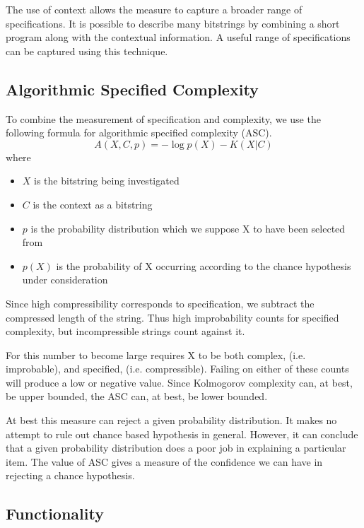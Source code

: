 The use of context allows the measure to capture a broader range of specifications.
It is possible to describe many bitstrings by combining a short program along with the contextual information.
A useful range of specifications can be captured using this technique.

\subsection{Algorithmic Specified Complexity}

To combine the measurement of specification and complexity, we use the following formula for algorithmic specified complexity (ASC).
\begin{equation}
    \label{ASC}
    A(X,C,p) = -\log p(X) - K(X|C)
\end{equation} where
\begin{itemize}
    \item $X$ is the bitstring being investigated
    \item $C$ is the context as a bitstring
    \item $p$ is the probability distribution which we suppose X to have been selected from
    \item $p(X)$ is the probability of X occurring according to the chance hypothesis under consideration
\end{itemize}
Since high compressibility corresponds to specification, we subtract the compressed length of the string.
Thus high improbability counts for specified complexity, but incompressible strings count against it.

For this number to become large requires X to be both complex, (i.e. improbable), and specified, (i.e. compressible).
Failing on either of these counts will produce a low or negative value.
Since Kolmogorov complexity can, at best, be upper bounded, the ASC can, at best, be lower bounded.

At best this measure can reject a given probability distribution.
It makes no attempt to rule out chance based hypothesis in general.
However, it can conclude that a given probability distribution does a poor job in explaining a particular item.
The value of ASC gives a measure of the confidence we can have in rejecting a chance hypothesis.

\subsection{Functionality}

